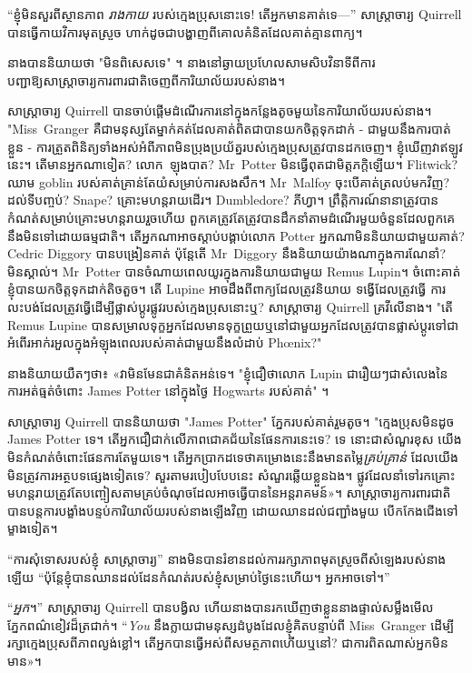 “ខ្ញុំមិនសួរពីស្ថានភាព \emph{រាងកាយ} របស់ក្មេងប្រុសនោះទេ! តើអ្នកមានគាត់ទេ—” សាស្ត្រាចារ្យ Quirrell បានធ្វើកាយវិការមុតស្រួច ហាក់ដូចជាបង្ហាញពីគោលគំនិតដែលគាត់គ្មានពាក្យ។

នាងបាននិយាយថា "មិនពិសេសទេ" ។ នាងនៅឆ្ងាយប្រហែលសាមសិបវិនាទីពីការបញ្ជាឱ្យសាស្ត្រាចារ្យការពារជាតិចេញពីការិយាល័យរបស់នាង។

សាស្រ្តាចារ្យ Quirrell បានចាប់ផ្តើមដំណើរការនៅក្នុងកន្លែងតូចមួយនៃការិយាល័យរបស់នាង។ "Miss~Granger គឺជាមនុស្សតែម្នាក់គត់ដែលគាត់ពិតជាបានយកចិត្តទុកដាក់ - ជាមួយនឹងការបាត់ខ្លួន - ការត្រួតពិនិត្យទាំងអស់អំពីភាពមិនប្រុងប្រយ័ត្នរបស់ក្មេងប្រុសត្រូវបានដកចេញ។ ខ្ញុំឃើញវាឥឡូវនេះ។ តើមានអ្នកណាទៀត? លោក~ឡុងបាត? Mr~Potter មិន​ធ្វើ​ពុត​ជា​មិត្ត​ភក្តិ​ឡើយ។ Flitwick? ឈាម goblin របស់គាត់គ្រាន់តែយំសម្រាប់ការសងសឹក។ Mr~Malfoy ចុះបើគាត់ត្រលប់មកវិញ? ដល់ទីបញ្ចប់? Snape? គ្រោះមហន្តរាយដើរ។ Dumbledore? ភីហ្វា។ ព្រឹត្តិការណ៍នានាត្រូវបានកំណត់សម្រាប់គ្រោះមហន្តរាយរួចហើយ ពួកគេត្រូវតែត្រូវបានដឹកនាំតាមដំណើរមួយចំនួនដែលពួកគេនឹងមិនទៅដោយធម្មជាតិ។ តើអ្នកណាអាចស្តាប់បង្គាប់លោក Potter អ្នកណាមិននិយាយជាមួយគាត់? Cedric Diggory បានបង្រៀនគាត់ ប៉ុន្តែតើ Mr~Diggory នឹងនិយាយយ៉ាងណាក្នុងការណែនាំ? មិនស្គាល់។ Mr~Potter បានចំណាយពេលយូរក្នុងការនិយាយជាមួយ Remus Lupin។ ចំពោះគាត់ខ្ញុំបានយកចិត្តទុកដាក់តិចតួច។ តើ Lupine អាចដឹងពីពាក្យដែលត្រូវនិយាយ ទង្វើដែលត្រូវធ្វើ ការលះបង់ដែលត្រូវធ្វើដើម្បីផ្លាស់ប្តូរផ្លូវរបស់ក្មេងប្រុសនោះឬ? សាស្រ្តាចារ្យ Quirrell គ្រវីលើនាង។ "តើ Remus Lupine បានសម្រាលទុក្ខអ្នកដែលមានទុក្ខព្រួយឬនៅជាមួយអ្នកដែលត្រូវបានផ្លាស់ប្តូរទៅជាអំពើរអាក់រអួលក្នុងអំឡុងពេលរបស់គាត់ជាមួយនឹងលំដាប់ Phœnix?"

នាង​និយាយ​យឺតៗ​ថា​៖ «​វា​មិន​មែន​ជា​គំនិត​អន់​ទេ​។ "ខ្ញុំជឿថាលោក Lupin ជារឿយៗជាសំលេងនៃការអត់ធ្មត់ចំពោះ James Potter នៅក្នុងថ្ងៃ Hogwarts របស់គាត់" ។

សាស្រ្តាចារ្យ Quirrell បាននិយាយថា "James Potter" ភ្នែករបស់គាត់រួមតូច។ "ក្មេងប្រុសមិនដូច James Potter ទេ។ តើអ្នកជឿជាក់លើភាពជោគជ័យនៃផែនការនេះទេ? ទេ នោះជាសំណួរខុស យើងមិនកំណត់ចំពោះផែនការតែមួយទេ។ តើអ្នកប្រាកដទេថាគម្រោងនេះនឹងមានតម្លៃ\emph{គ្រប់គ្រាន់} ដែលយើងមិនត្រូវការអត្ថបទផ្សេងទៀតទេ? សួរតាមរបៀបបែបនេះ សំណួរឆ្លើយខ្លួនឯង។ ផ្លូវ​ដែល​នាំ​ទៅ​រក​គ្រោះ​មហន្តរាយ​ត្រូវ​តែ​បញ្ចៀស​តាម​គ្រប់​ចំណុច​ដែល​អាច​ធ្វើ​បាន​នៃ​អន្តរាគមន៍»។ សាស្ត្រាចារ្យ​ការពារ​ជាតិ​បាន​បន្ត​ការ​បង្ខាំង​បន្ទប់​ការិយាល័យ​របស់​នាង​ឡើង​វិញ ដោយ​ឈាន​ដល់​ជញ្ជាំង​មួយ បើក​កែង​ជើង​ទៅ​ម្ខាង​ទៀត។

“ការសុំទោសរបស់ខ្ញុំ សាស្រ្តាចារ្យ” នាងមិនបានរំខានដល់ការរក្សាភាពមុតស្រួចពីសំឡេងរបស់នាងឡើយ “ប៉ុន្តែខ្ញុំបានឈានដល់ដែនកំណត់របស់ខ្ញុំសម្រាប់ថ្ងៃនេះហើយ។ អ្នកអាចទៅ។”

“\emph{អ្នក}។” សាស្រ្តាចារ្យ Quirrell បានបង្វិល ហើយនាងបានរកឃើញថាខ្លួននាងផ្ទាល់សម្លឹងមើលភ្នែកពណ៌ខៀវដ៏ត្រជាក់។ “\emph{You} នឹងក្លាយជាមនុស្សដំបូងដែលខ្ញុំគិតបន្ទាប់ពី Miss~Granger ដើម្បីរក្សាក្មេងប្រុសពីភាពល្ងង់ខ្លៅ។ តើអ្នកបានធ្វើអស់ពីសមត្ថភាពហើយឬនៅ? ជា​ការ​ពិត​ណាស់​អ្នក​មិន​មាន​»។


